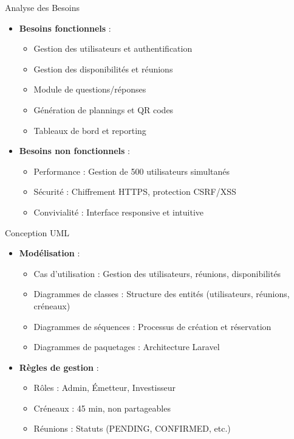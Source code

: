 \documentclass{beamer}
\begin{document}
\begin{frame}{Analyse des Besoins}
\begin{itemize}
    \item \textbf{Besoins fonctionnels} :
    \begin{itemize}
        \item Gestion des utilisateurs et authentification
        \item Gestion des disponibilités et réunions
        \item Module de questions/réponses
        \item Génération de plannings et QR codes
        \item Tableaux de bord et reporting
    \end{itemize}
    \item \textbf{Besoins non fonctionnels} :
    \begin{itemize}
        \item Performance : Gestion de 500 utilisateurs simultanés
        \item Sécurité : Chiffrement HTTPS, protection CSRF/XSS
        \item Convivialité : Interface responsive et intuitive
    \end{itemize}
\end{itemize}
\end{frame}

\begin{frame}{Conception UML}
\begin{itemize}
    \item \textbf{Modélisation} :
    \begin{itemize}
        \item Cas d'utilisation : Gestion des utilisateurs, réunions, disponibilités
        \item Diagrammes de classes : Structure des entités (utilisateurs, réunions, créneaux)
        \item Diagrammes de séquences : Processus de création et réservation
        \item Diagrammes de paquetages : Architecture Laravel
    \end{itemize}
    \item \textbf{Règles de gestion} :
    \begin{itemize}
        \item Rôles : Admin, Émetteur, Investisseur
        \item Créneaux : 45 min, non partageables
        \item Réunions : Statuts (PENDING, CONFIRMED, etc.)
    \end{itemize}
\end{itemize}
\end{frame}
\end{document}
